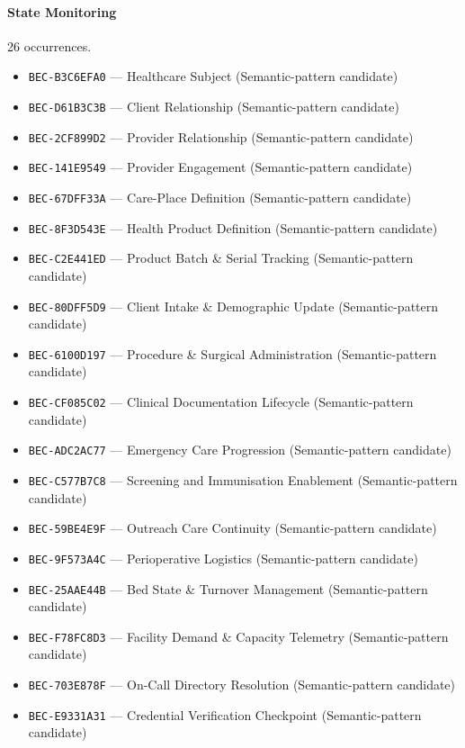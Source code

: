 \documentclass[11pt,a4paper,openany]{book}
\begin{document}
\paragraph{State Monitoring} 26 occurrences.\par
\begin{itemize}
\item \texttt{BEC-B3C6EFA0} --- Healthcare Subject (Semantic-pattern candidate)
\item \texttt{BEC-D61B3C3B} --- Client Relationship (Semantic-pattern candidate)
\item \texttt{BEC-2CF899D2} --- Provider Relationship (Semantic-pattern candidate)
\item \texttt{BEC-141E9549} --- Provider Engagement (Semantic-pattern candidate)
\item \texttt{BEC-67DFF33A} --- Care-Place Definition (Semantic-pattern candidate)
\item \texttt{BEC-8F3D543E} --- Health Product Definition (Semantic-pattern candidate)
\item \texttt{BEC-C2E441ED} --- Product Batch \& Serial Tracking (Semantic-pattern candidate)
\item \texttt{BEC-80DFF5D9} --- Client Intake \& Demographic Update (Semantic-pattern candidate)
\item \texttt{BEC-6100D197} --- Procedure \& Surgical Administration (Semantic-pattern candidate)
\item \texttt{BEC-CF085C02} --- Clinical Documentation Lifecycle (Semantic-pattern candidate)
\item \texttt{BEC-ADC2AC77} --- Emergency Care Progression (Semantic-pattern candidate)
\item \texttt{BEC-C577B7C8} --- Screening and Immunisation Enablement (Semantic-pattern candidate)
\item \texttt{BEC-59BE4E9F} --- Outreach Care Continuity (Semantic-pattern candidate)
\item \texttt{BEC-9F573A4C} --- Perioperative Logistics (Semantic-pattern candidate)
\item \texttt{BEC-25AAE44B} --- Bed State \& Turnover Management (Semantic-pattern candidate)
\item \texttt{BEC-F78FC8D3} --- Facility Demand \& Capacity Telemetry (Semantic-pattern candidate)
\item \texttt{BEC-703E878F} --- On-Call Directory Resolution (Semantic-pattern candidate)
\item \texttt{BEC-E9331A31} --- Credential Verification Checkpoint (Semantic-pattern candidate)

\end{itemize}
\end{document}
